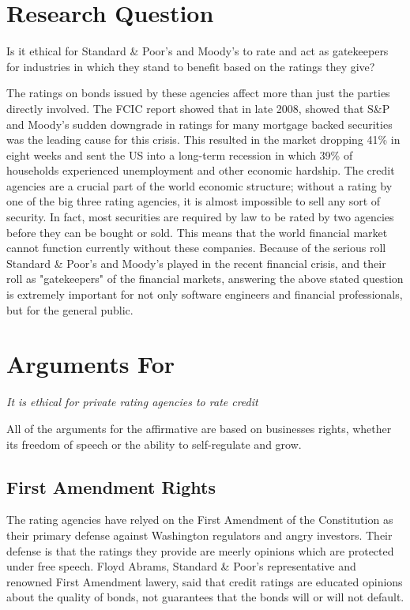 \documentclass[11pt]{article}
\begin{document}
\begin{multicols}{2}

\section{Research Question}
Is it ethical for Standard \& Poor's and Moody's to rate and act as gatekeepers for industries in which they stand to benefit based on the ratings they give?

The ratings on bonds issued by these agencies affect more than just the parties directly involved. The FCIC report showed that in late 2008, showed that S\&P and Moody's sudden downgrade in ratings for many mortgage backed securities was the leading cause for this crisis. \cite{huffCreditCause}  This resulted in the market dropping 41\% in eight weeks \cite{marketWatch} and sent the US into a long-term recession in which 39\% of households experienced unemployment and other economic hardship. \cite{collapseImpact}  The credit agencies are a crucial part of the world economic structure; without a rating by one of the big three rating agencies, it is almost impossible to sell any sort of security.  In fact, most securities are required by law to be rated by two agencies before they can be bought or sold. \cite{wpMoodies}  This means that the world financial market cannot function currently without these companies.  Because of the serious roll Standard \& Poor's and Moody's played in the recent financial crisis, and their roll as "gatekeepers" of the financial markets, answering the above stated question is extremely important for not only software engineers and financial professionals, but for the general public.    

\section{Arguments For}
\textit{It is ethical for private rating agencies to rate credit}

All of the arguments for the affirmative are based on businesses rights, whether its freedom of speech or the ability to self-regulate and grow.
\subsection{First Amendment Rights}
The rating agencies have relyed on the First Amendment of the Constitution as their primary defense against Washington regulators and angry investors. Their defense is that the ratings they provide are meerly opinions which are protected under free speech.  Floyd Abrams, Standard \& Poor's representative and renowned First Amendment lawery, said that credit ratings are educated opinions about the quality of bonds, not guarantees that the bonds will or will not default. 

\end{multicols}
\end{document}

